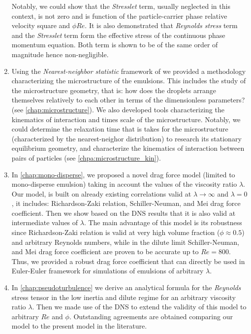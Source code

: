 \begin{enumerate}
    Notably, we could show that the \textit{Stresslet} term, usually neglected in this context, is not zero and is function of the particle-carrier phase relative velocity square and $\phi Re$.  
    It is also demonstrated that \textit{Reynolds stress} term and the \textit{Stresslet} term form the effective stress of the continuous phase momentum equation. 
    Both term is shown to be of the same order of magnitude hence non-negligible. 
    \item Using the \textit{Nearest-neighbor statistic} framework of \citet{zhang2023evolution} we provided a methodology characterizing the microstructure of the emulsions. 
    This includes the study of the microstructure geometry, that is: how does the droplets arrange themselves relatively to each other in terms of the dimensionless parameters? (see \ref{chap:microstructure}). 
    We also developed tools characterizing the kinematics of interaction and times scale of the microstructure. 
    Notably, we could determine the relaxation time that is takes for the microstructure (characterized by the nearest-neighor distribution) to research its stationary equilibrium geometry, and characterize the kinematics   of interaction between pairs of particles (see \ref{chpa:microstructure_kin}). 
    \item In \ref{chap:mono-disperse}, we proposed a novel drag force model (limited to mono-disperse emulsion) taking in account the values of the viscosity ratio $\lambda$. 
    Our model, is built on already existing correlations valid at $\lambda\to\infty$ and $\lambda = 0$, it includes: Richardson-Zaki relation, Schiller-Neuman, and Mei drag force coefficient.
    Then we show based on the DNS results that it is also valid at intermediate values of $\lambda$.
    The main advantage of this model is its robustness since Richardson-Zaki relation is valid at very high volume fraction  ($\phi \approx 0.5$) and arbitrary Reynolds numbers, while in the dilute limit Schiller-Neuman, and Mei drag force coefficient are proven to be accurate up to $Re = 800$. 
    Thus, we provided a robust drag force coefficient that can directly be used in Euler-Euler framework for simulations of emulsions of arbitrary $\lambda$.   
    \item In \ref{chap:pseudoturbulence} we derive an analytical formula for the \textit{Reynolds} stress tensor in the low inertia and dilute regime for an arbitrary viscosity ratio $\lambda$. 
    Then we made use of the DNS to extend the validity of this model to arbitrary $Re$ and $\phi$. 
    Outstanding agreements are obtained comparing our model to the present model in the literature.  
\end{enumerate}

